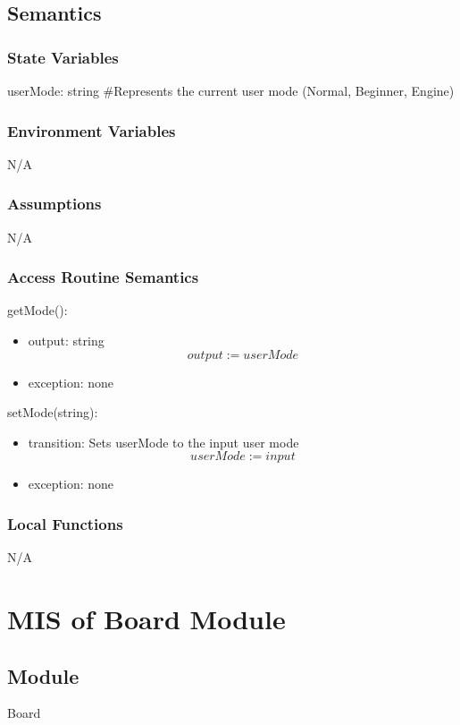 \documentclass[12pt, titlepage]{article}
\begin{document}
    \subsection{Semantics}
    \subsubsection{State Variables}
    userMode: string \#Represents the current user mode (Normal, Beginner, Engine)

    \subsubsection{Environment Variables}
    N/A

    \subsubsection{Assumptions}
    N/A

    \subsubsection{Access Routine Semantics}
        \noindent getMode():
        \begin{itemize}
            \item output: string 
                \[output := userMode\]
            \item exception: none
        \end{itemize}

        \noindent setMode(string):
        \begin{itemize}
            \item transition: Sets userMode to the input user mode 
                \[userMode := input\]
            \item exception: none
        \end{itemize}

    \subsubsection{Local Functions}
    N/A

    \newpage

\section{MIS of Board Module} \label{mBoard}

    \subsection{Module}
    Board
\end{document}
